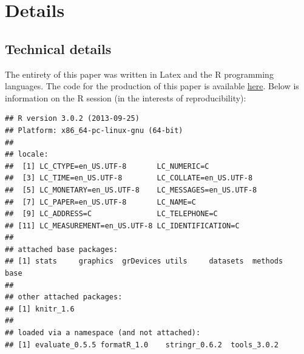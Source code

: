 \clearpage
\section*{Details}

\subsection*{Technical details} The entirety of this paper was written in Latex and the R programming languages.  The code for the production of this paper is available \href{https://github.com/joebrew/uf}{here}.  Below is information on the R session (in the interests of reproducibility):
\begin{knitrout}
\color{fgcolor}\begin{kframe}
\begin{verbatim}
## R version 3.0.2 (2013-09-25)
## Platform: x86_64-pc-linux-gnu (64-bit)
## 
## locale:
##  [1] LC_CTYPE=en_US.UTF-8       LC_NUMERIC=C              
##  [3] LC_TIME=en_US.UTF-8        LC_COLLATE=en_US.UTF-8    
##  [5] LC_MONETARY=en_US.UTF-8    LC_MESSAGES=en_US.UTF-8   
##  [7] LC_PAPER=en_US.UTF-8       LC_NAME=C                 
##  [9] LC_ADDRESS=C               LC_TELEPHONE=C            
## [11] LC_MEASUREMENT=en_US.UTF-8 LC_IDENTIFICATION=C       
## 
## attached base packages:
## [1] stats     graphics  grDevices utils     datasets  methods   base     
## 
## other attached packages:
## [1] knitr_1.6
## 
## loaded via a namespace (and not attached):
## [1] evaluate_0.5.5 formatR_1.0    stringr_0.6.2  tools_3.0.2
\end{verbatim}
\end{kframe}
\end{knitrout}


